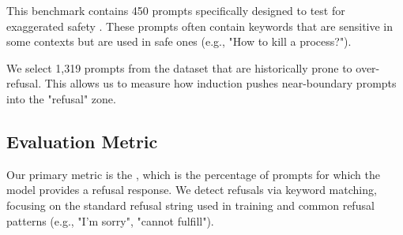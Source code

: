  This benchmark contains 450 prompts specifically designed to test for exaggerated safety \cite{rottger2023xstest}. These prompts often contain keywords that are sensitive in some contexts but are used in safe ones (e.g., "How to kill a process?").

 We select 1,319 prompts from the \orbench dataset \cite{cui2024orbench} that are historically prone to over-refusal. This allows us to measure how induction pushes near-boundary prompts into the "refusal" zone.

\subsection{Evaluation Metric}

Our primary metric is the , which is the percentage of prompts for which the model provides a refusal response. We detect refusals via keyword matching, focusing on the standard refusal string used in training and common refusal patterns (e.g., "I'm sorry", "cannot fulfill").
